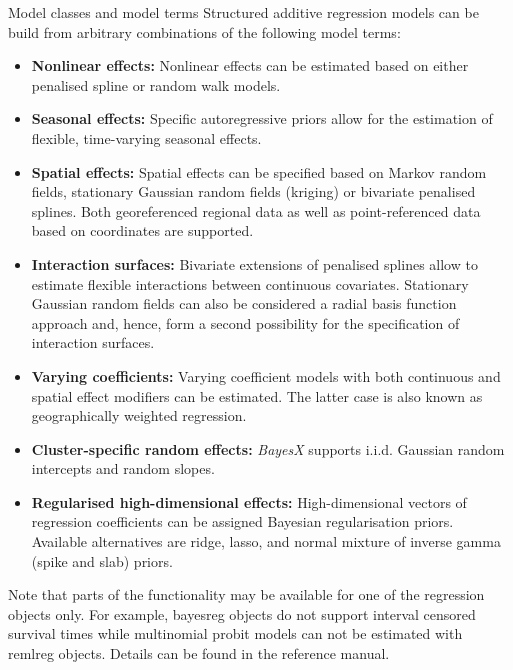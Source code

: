 \begin{stanza}{Model classes and model terms}
Structured additive regression models can be build from arbitrary
combinations of the following model terms:

\begin{itemize}
\item{\bf\sffamily Nonlinear effects:} Nonlinear effects can be estimated based on either penalised spline or random walk
    models.

\item{\bf\sffamily Seasonal effects:} Specific autoregressive priors allow for the estimation of flexible, time-varying
    seasonal effects.

\item{\bf\sffamily Spatial effects:} Spatial effects can be specified based on Markov random fields, stationary Gaussian
    random fields (kriging) or bivariate penalised splines. Both georeferenced regional data as well as point-referenced
    data based on coordinates are supported.

\item{\bf\sffamily Interaction surfaces:} Bivariate extensions of penalised splines allow to estimate flexible interactions
    between continuous covariates. Stationary Gaussian random fields can also be considered a radial basis function
    approach and, hence, form a second possibility for the specification of interaction surfaces.

\item{\bf\sffamily Varying coefficients:} Varying coefficient models with both continuous and spatial effect modifiers can
    be estimated. The latter case is also known as geographically weighted regression.

\item{\bf\sffamily Cluster-specific random effects:} {\em BayesX} supports i.i.d. Gaussian random intercepts and random
    slopes.

\item {\bf\sffamily Regularised high-dimensional effects:} High-dimensional vectors of regression coefficients can be
    assigned Bayesian regularisation priors. Available alternatives are ridge, lasso, and normal mixture of inverse gamma
    (spike and slab) priors.
\end{itemize}

Note that parts of the functionality may be available for one of the regression objects only. For example, bayesreg objects do
not support interval censored survival times while multinomial probit models can not be estimated with remlreg objects. Details
can be found in the reference manual.
\end{stanza}

